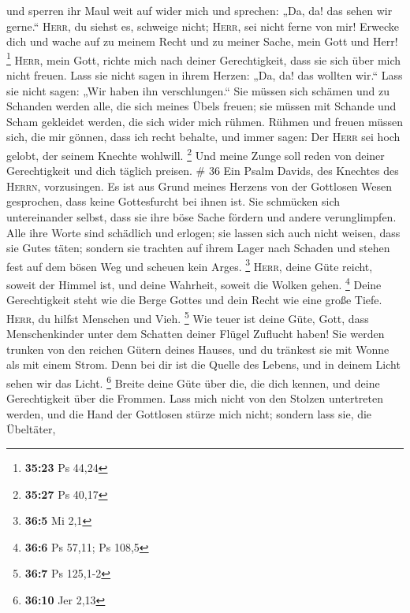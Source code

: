  und sperren ihr Maul weit auf wider mich und sprechen:
„Da, da! das sehen wir gerne.``  \textsc{Herr}, du siehst
es, schweige nicht; \textsc{Herr}, sei nicht ferne von mir!
 Erwecke dich und wache auf zu meinem Recht und zu meiner
Sache, mein Gott und Herr! \footnote{\textbf{35:23} Ps 44,24}
 \textsc{Herr}, mein Gott, richte mich nach deiner
Gerechtigkeit, dass sie sich über mich nicht freuen. 
Lass sie nicht sagen in ihrem Herzen: „Da, da! das wollten wir.`` Lass
sie nicht sagen: „Wir haben ihn verschlungen.``  Sie
müssen sich schämen und zu Schanden werden alle, die sich meines Übels
freuen; sie müssen mit Schande und Scham gekleidet werden, die sich
wider mich rühmen.  Rühmen und freuen müssen sich, die
mir gönnen, dass ich recht behalte, und immer sagen: Der \textsc{Herr}
sei hoch gelobt, der seinem Knechte wohlwill. \footnote{\textbf{35:27}
  Ps 40,17}  Und meine Zunge soll reden von deiner
Gerechtigkeit und dich täglich preisen. \# 36  Ein Psalm
Davids, des Knechtes des \textsc{Herrn}, vorzusingen.  Es
ist aus Grund meines Herzens von der Gottlosen Wesen gesprochen, dass
keine Gottesfurcht bei ihnen ist.  Sie schmücken sich
untereinander selbst, dass sie ihre böse Sache fördern und andere
verunglimpfen.  Alle ihre Worte sind schädlich und
erlogen; sie lassen sich auch nicht weisen, dass sie Gutes täten;
 sondern sie trachten auf ihrem Lager nach Schaden und
stehen fest auf dem bösen Weg und scheuen kein Arges. \footnote{\textbf{36:5}
  Mi 2,1}  \textsc{Herr}, deine Güte reicht, soweit der
Himmel ist, und deine Wahrheit, soweit die Wolken gehen. \footnote{\textbf{36:6}
  Ps 57,11; Ps 108,5}  Deine Gerechtigkeit steht wie die
Berge Gottes und dein Recht wie eine große Tiefe. \textsc{Herr}, du
hilfst Menschen und Vieh. \footnote{\textbf{36:7} Ps 125,1-2}
 Wie teuer ist deine Güte, Gott, dass Menschenkinder unter
dem Schatten deiner Flügel Zuflucht haben!  Sie werden
trunken von den reichen Gütern deines Hauses, und du tränkest sie mit
Wonne als mit einem Strom.  Denn bei dir ist die Quelle
des Lebens, und in deinem Licht sehen wir das Licht. \footnote{\textbf{36:10}
  Jer 2,13}  Breite deine Güte über die, die dich kennen,
und deine Gerechtigkeit über die Frommen.  Lass mich
nicht von den Stolzen untertreten werden, und die Hand der Gottlosen
stürze mich nicht;  sondern lass sie, die Übeltäter,
